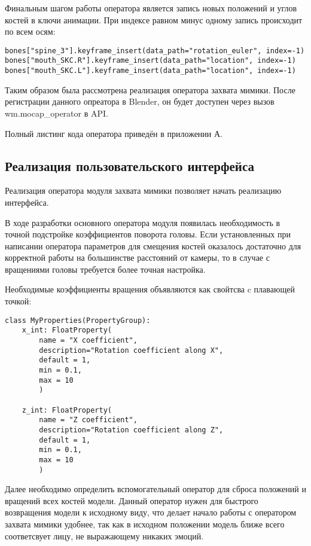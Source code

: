 Финальным шагом работы оператора является запись новых положений и углов костей в ключи анимации. При индексе равном минус одному запись происходит по всем осям:
\begin{lstlisting}
bones["spine_3"].keyframe_insert(data_path="rotation_euler", index=-1)
bones["mouth_SKC.R"].keyframe_insert(data_path="location", index=-1)
bones["mouth_SKC.L"].keyframe_insert(data_path="location", index=-1)
\end{lstlisting}

Таким образом была рассмотрена реализация оператора захвата мимики. После регистрации данного опреатора в Blender, он будет доступен через вызов wm.mocap\_operator в API. 

Полный листинг кода оператора приведён в приложении А.


\subsection {Реализация пользовательского интерфейса}

Реализация оператора модуля захвата мимики позволяет начать реализацию интерфейса.

В ходе разработки основного оператора модуля появилась необходимость в точной подстройке коэффициентов поворота головы. Если установленных при написании оператора параметров для смещения костей оказалось достаточно для корректной работы на большинстве расстояний от камеры, то в случае с вращениями головы требуется более точная настройка.

Необходимые коэффициенты вращения объявляются как свойтсва c плавающей точкой:
\begin{lstlisting}
class MyProperties(PropertyGroup):
	x_int: FloatProperty(
		name = "X coefficient",
		description="Rotation coefficient along X",
		default = 1,
		min = 0.1,
		max = 10
		)
	
	z_int: FloatProperty(
		name = "Z coefficient",
		description="Rotation coefficient along Z",
		default = 1,
		min = 0.1,
		max = 10
		)
\end{lstlisting}

Далее необходимо определить вспомогательный оператор для сброса положений и вращений всех костей модели. Данный оператор нужен для быстрого возвращения модели к исходному виду, что делает начало работы с оператором захвата мимики удобнее, так как в исходном положении модель ближе всего соответсвует лицу, не выражающему никаких эмоций.

